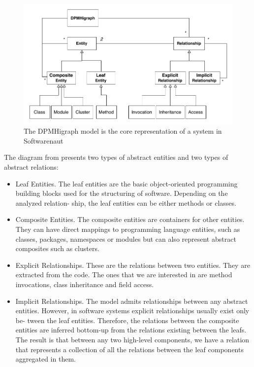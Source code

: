 \documentclass[preprint,12pt]{elsarticle}
\begin{document}
\begin{figure}[h]
\begin{center}
\includegraphics[width=0.7\linewidth]{images/HigraphModel}
\caption{The DPMHigraph model is the core representation of a system in Softwarenaut}
\end{center}
\end{figure}


The diagram from  presents two types of abstract entities and two types of abstract relations:
\begin{itemize}
\item Leaf Entities. The leaf entities are the basic object-oriented programming building blocks used for the structuring of software. Depending on the analyzed relation- ship, the leaf entities can be either methods or classes.
\item Composite Entities. The composite entities are containers for other entities. They can have direct mappings to programming language entities, such as classes, packages, namespaces or modules but can also represent abstract composites such as clusters.
\item Explicit Relationships. These are the relations between two entities. They are extracted from the code. The ones that we are interested in are method invocations, class inheritance and field access.
\item Implicit Relationships. The model admits relationships between any abstract entities. However, in software systems explicit relationships usually exist only be- tween the leaf entities. Therefore, the relations between the composite entities are inferred bottom-up from the relations existing between the leafs. The result is that between any two high-level components, we have a relation that represents a collection of all the relations between the leaf components aggregated in them.
\end{itemize}
\end{document}

